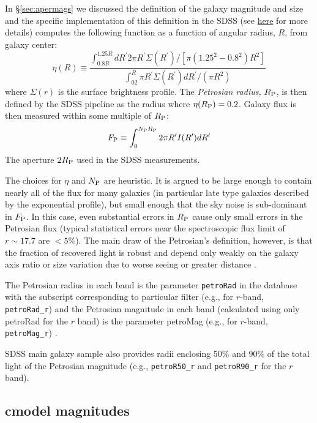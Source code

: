 In \S \ref{sec:apermags} we discussed the \citet{petrosian76} definition of the galaxy magnitude and size and the specific implementation of this definition in the SDSS  (see \href{http://skyserver.sdss.org/dr1/en/help/docs/algorithm.asp?key=mag_petro}{here} for more details) computes the following function as a function of angular radius, $R$, from galaxy center:
\begin{equation}
\eta(R)\equiv\frac{\int_{0.8R}^{1.25R}dR^\prime 2\pi R^\prime \Sigma(R^\prime)/[\pi(1.25^2-0.8^2)R^2]}{\int^R_02\pi R^\prime \Sigma(R^\prime) dR^\prime/(\pi R^{2})}
\label{eq:Rpetro}
\end{equation}
where $\Sigma(r)$ is the surface brightness profile. The {\it Petrosian radius,\/} $R_{\rm P}$, is then defined by the SDSS pipeline as the radius where $\eta(R_{\rm P})=0.2$.
Galaxy flux is then measured within some multiple of $R_{\rm P}$:
\begin{equation}
F_{\rm P}\equiv \int^{N_{\rm P}R_{\rm P}}_0 2\pi R^\prime I(R^\prime)dR^\prime
\label{eq:fPetro}
\end{equation}
The aperture $2R_{\rm P}$ used in the SDSS measurements. 

The choices for $\eta$ and $N_{\rm P}$ are heuristic. It  is argued to be large enough to contain nearly all of the flux for many galaxies (in particular late type galaxies described by the exponential profile), but small enough that the sky noise is sub-dominant in $F_{\rm P}$. In this case, even substantial errors in $R_{\rm P}$ cause only small errors in the Petrosian flux (typical statistical errors near the spectroscopic flux limit of $r \sim 17.7$ are $< 5\%$). The 
 main draw of the Petrosian's definition, however, is that the fraction of recovered light is robust and depend  only weakly on the galaxy axis ratio or size variation due to worse seeing or greater distance \href{http://adsabs.harvard.edu/abs/2001AJ....121.2358B}{\citep[e.g.,][]{blanton_etal01}}. 

The Petrosian radius in each band is the parameter {\tt petroRad} in the database with the subscript corresponding to 
particular filter (e.g., for $r$-band, {\tt petroRad\_r}) and the Petrosian magnitude in each band (calculated using only petroRad for the $r$ band) is the parameter petroMag (e.g., for $r$-band, {\tt petroMag\_r}) . 

SDSS main galaxy sample  also provides radii enclosing 50\% and 90\% of the total light of the Petrosian magnitude (e.g., {\tt petroR50\_r} and {\tt petroR90\_r} for the $r$ band). 

\subsection{cmodel magnitudes}
\label{sec:cmodelmag}
